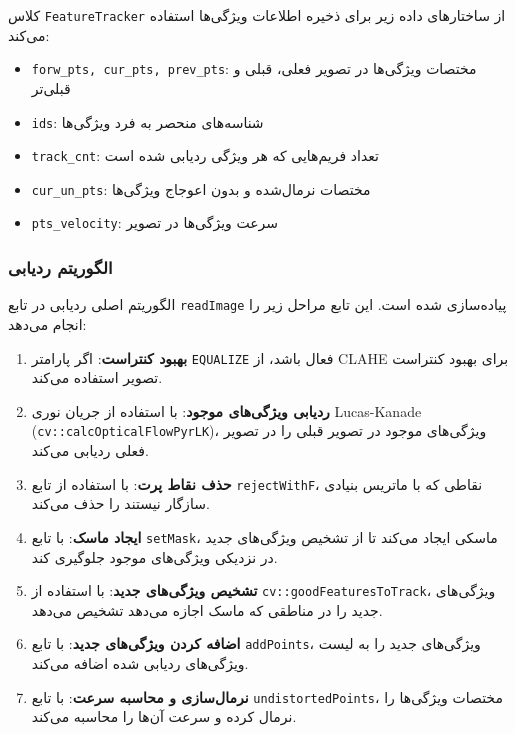 \documentclass[11pt, a4paper]{article}
\begin{document}
	کلاس \texttt{FeatureTracker} از ساختارهای داده زیر برای ذخیره اطلاعات ویژگی‌ها استفاده می‌کند:
	
	\begin{itemize}
		\item \texttt{forw\_pts, cur\_pts, prev\_pts}: مختصات ویژگی‌ها در تصویر فعلی، قبلی و قبلی‌تر
		\item \texttt{ids}: شناسه‌های منحصر به فرد ویژگی‌ها
		\item \texttt{track\_cnt}: تعداد فریم‌هایی که هر ویژگی ردیابی شده است
		\item \texttt{cur\_un\_pts}: مختصات نرمال‌شده و بدون اعوجاج ویژگی‌ها
		\item \texttt{pts\_velocity}: سرعت ویژگی‌ها در تصویر
	\end{itemize}
	
	\subsubsection{الگوریتم ردیابی}
	\label{subsubsec:tracking_algorithm}
	
	الگوریتم اصلی ردیابی در تابع \texttt{readImage} پیاده‌سازی شده است. این تابع مراحل زیر را انجام می‌دهد:
	
	\begin{enumerate}
		\item \textbf{بهبود کنتراست}: اگر پارامتر \texttt{EQUALIZE} فعال باشد، از CLAHE برای بهبود کنتراست تصویر استفاده می‌کند.
		
		\item \textbf{ردیابی ویژگی‌های موجود}: با استفاده از جریان نوری Lucas-Kanade (\texttt{cv::calcOpticalFlowPyrLK})، ویژگی‌های موجود در تصویر قبلی را در تصویر فعلی ردیابی می‌کند.
		
		\item \textbf{حذف نقاط پرت}: با استفاده از تابع \texttt{rejectWithF}، نقاطی که با ماتریس بنیادی سازگار نیستند را حذف می‌کند.
		
		\item \textbf{ایجاد ماسک}: با تابع \texttt{setMask}، ماسکی ایجاد می‌کند تا از تشخیص ویژگی‌های جدید در نزدیکی ویژگی‌های موجود جلوگیری کند.
		
		\item \textbf{تشخیص ویژگی‌های جدید}: با استفاده از \texttt{cv::goodFeaturesToTrack}، ویژگی‌های جدید را در مناطقی که ماسک اجازه می‌دهد تشخیص می‌دهد.
		
		\item \textbf{اضافه کردن ویژگی‌های جدید}: با تابع \texttt{addPoints}، ویژگی‌های جدید را به لیست ویژگی‌های ردیابی شده اضافه می‌کند.
		
		\item \textbf{نرمال‌سازی و محاسبه سرعت}: با تابع \texttt{undistortedPoints}، مختصات ویژگی‌ها را نرمال کرده و سرعت آن‌ها را محاسبه می‌کند.
	\end{enumerate}
	
\end{document}
